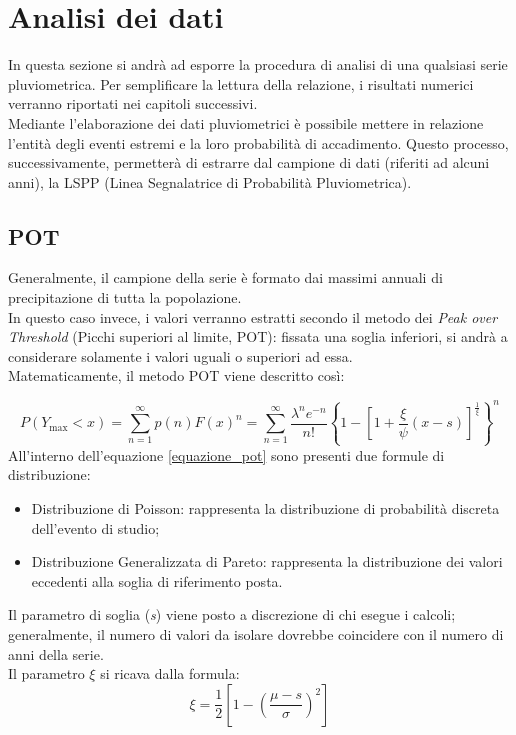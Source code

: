 \section{Analisi dei dati}
In questa sezione si andrà ad esporre la procedura di analisi di una qualsiasi serie pluviometrica. Per semplificare la lettura della relazione, i risultati numerici verranno riportati nei capitoli successivi.\\
Mediante l'elaborazione dei dati pluviometrici è possibile mettere in relazione l'entità degli eventi estremi e la loro probabilità di accadimento. Questo processo, successivamente, permetterà di estrarre dal campione di dati (riferiti ad alcuni anni), la LSPP (Linea Segnalatrice di Probabilità Pluviometrica).\\
\subsection{POT}
Generalmente, il campione della serie è formato dai massimi annuali di precipitazione di tutta la popolazione.\\
In questo caso invece, i valori verranno estratti secondo il metodo dei \textit{Peak over Threshold} (Picchi superiori al limite, POT): fissata una soglia inferiori, si andrà a considerare solamente i valori uguali o superiori ad essa.\\
Matematicamente, il metodo POT viene descritto così:

   \begin{equation} 
  P(Y_{\text{max}} < x) = \sum_{n=1}^{\infty} p(n) F(x)^n = \sum_{n=1}^{\infty} \frac{\lambda^n e^{-n}}{n!} \left\{ 1 - \left[ 1 + \frac{\xi}{\psi} (x - s) \right]^{\frac{1}{\xi}} \right\}^n
\label{equazione_pot}   
\end{equation}
All'interno dell'equazione \ref{equazione_pot} sono presenti due formule di distribuzione:
\begin{itemize}
    \item Distribuzione di Poisson: rappresenta la distribuzione di probabilità discreta dell'evento di studio;
    \item Distribuzione Generalizzata di Pareto: rappresenta la distribuzione dei valori eccedenti alla soglia di riferimento posta.
\end{itemize}

\noindent Il parametro di soglia (\textit{s}) viene posto a discrezione di chi esegue i calcoli; generalmente, il numero di valori da isolare dovrebbe coincidere con il numero di anni della serie.\\
Il parametro $\xi$ si ricava dalla formula:
\begin{equation}
    \xi = \frac{1}{2} \left[1- \left( \frac{\mu - s}{\sigma} \right)^2 \right] 
\end{equation}

